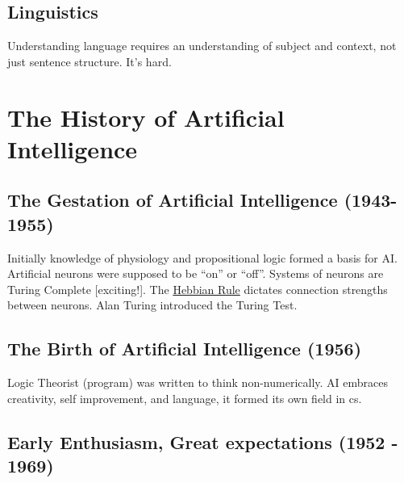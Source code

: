 
\subsection{Linguistics} %
\label{sub:linguistics}

Understanding language requires an understanding of subject and context, not just sentence structure.
It's hard.



\section{The History of Artificial Intelligence} %
\label{sec:the_history_of_artificial_intelligence}

\subsection{The Gestation of Artificial Intelligence (1943-1955)} %
\label{sub:the_gestation_of_artificial_intelligence_}

Initially knowledge of physiology and propositional logic formed a basis for AI.
Artificial neurons were supposed to be ``on'' or ``off''.
Systems of neurons are Turing Complete [exciting!].
The \uline{Hebbian Rule} dictates connection strengths between neurons.
Alan Turing introduced the Turing Test.


\subsection{The Birth of Artificial Intelligence (1956)} %
\label{sub:the_birth_of_artificial_intelligence_}

Logic Theorist (program) was written to think non-numerically.
AI embraces creativity, self improvement, and language, it formed its own field
in cs.


\subsection{Early Enthusiasm, Great expectations (1952 - 1969)} %
\label{sub:early_enthusiasm_great_expectations_}

